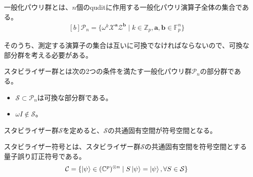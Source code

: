\documentclass[../master.tex]{subfiles}
\begin{document}
\begin{NoteBox}[title={一般化パウリ群}]{}
    一般化パウリ群とは、$n$個のquditに作用する一般化パウリ演算子全体の集合である。
    \begin{equation}\begin{aligned}[b]
        \mathcal{P}_n = \{ \omega^k \mathcal{X}^{\mathbf{a}} \mathcal{Z}^{\mathbf{b}} \mid k \in \mathbb{Z}_p, \mathbf{a},\mathbf{b} \in \mathbb{F}_p^n \}
    \end{aligned}\end{equation}
\end{NoteBox}

そのうち、測定する演算子の集合は互いに可換でなければならないので、可換な部分群を考える必要がある。
\begin{NoteBox}[title={スタビライザー群}]{}
    スタビライザー群とは次の2つの条件を満たす一般化パウリ群$\mathcal{P}_n$の部分群である。
    \begin{itemize}
        \item $\mathcal{S} \subset \mathcal{P}_n$は可換な部分群である。
        \item $\omega I \notin \mathcal{S}$。
    \end{itemize}
\end{NoteBox}

スタビライザー群$\mathcal{S}$を定めると、$\mathcal{S}$の共通固有空間が符号空間となる。
\begin{NoteBox}[title={スタビライザー符号}]{}
    スタビライザー符号とは、スタビライザー群$\mathcal{S}$の共通固有空間を符号空間とする量子誤り訂正符号である。
    \begin{equation}\begin{aligned}[b]
        \mathcal{C} = \{ \ket{\psi} \in (\mathbb{C}^p)^{\otimes n} \mid S\ket{\psi} = \ket{\psi}, \forall S \in \mathcal{S} \}
    \end{aligned}\end{equation}
\end{NoteBox}
\end{document}
